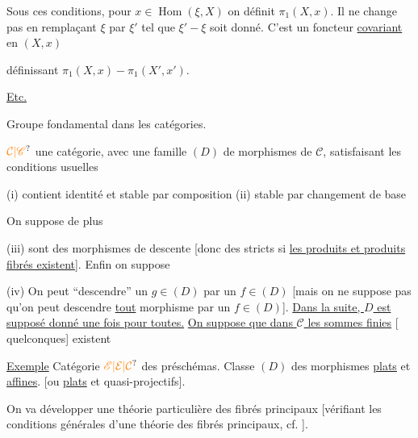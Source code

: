 Sous ces conditions, pour $x\in\operatorname{Hom}(\xi,X)$ on définit
$\pi_1(X,x)$. Il ne change pas  en remplaçant $\xi$ par $\xi'$ tel que
$\xi'\mathrel{-}\xi$ soit donné. C'est un foncteur \uline{covariant} en $(X,x)$

définissant $\pi_1(X,x)\mathrel{-}\pi_1(X',x')$.

\uline{Etc.}

Groupe fondamental dans les catégories.

$\unsure{\mathcal C|\mathscr C}$ une catégorie, avec une famille $(D)$ de morphismes
de $\mathcal C$, satisfaisant les conditions usuelles

(i) contient identité et stable par composition (ii) stable par
changement de base

On suppose de plus

(iii)   sont des morphismes de descente [donc des
 stricts  si  \uline{les produits et produits}
\uline{fibrés existent}]. Enfin on suppose

\margin{On peut \unsure{axer|varier|aussi} la situation, en introduisant de plus \deleted{\unsure{la}} une classe de morphismes $D'$ [\deleted{de} morphismes pouvant être \unsure{``localement''} \unsure{fibrés}.}

(iv) On peut ``descendre'' un $g\in(D)$ par un $f\in(D)$
[mais on ne suppose pas qu'on peut descendre
\uline{tout} morphisme par un $f\in(D)$]. \uline{Dans la
suite, $D$ est supposé donné une fois pour toutes.}
\uline{On suppose que dans $\mathcal C$ les sommes finies} [ quelconques] existent\unsure{]|.}


\uline{Exemple} Catégorie  $\unsure{\mathscr E|\mathcal E|\mathcal C}$ des préschémas. 
Classe $(D)$ des morphismes \uline{plats} et \uline{affines}.
[ou \uline{plats} et quasi-projectifs].

On va développer une théorie particulière des
fibrés principaux [vérifiant les conditions générales
d'une théorie des fibrés principaux, cf. \unsure{---}].

